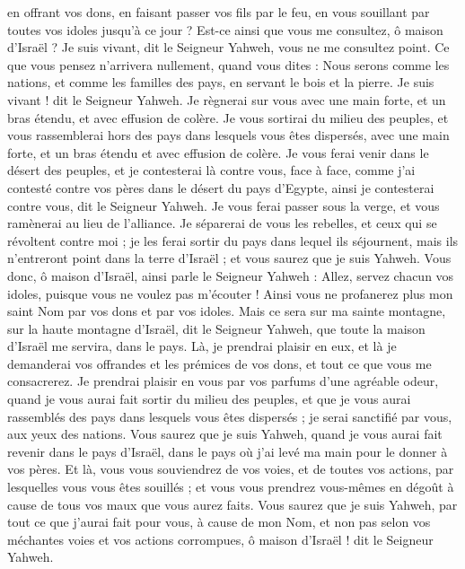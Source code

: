 \begin{multicols}{2}
en offrant vos dons, en faisant passer vos fils par le feu, en vous souillant par toutes vos idoles jusqu'à ce jour ? Est-ce ainsi que vous me consultez, ô maison d'Israël ? Je suis vivant, dit le Seigneur Yahweh, vous ne me consultez point.
Ce que vous pensez n'arrivera nullement, quand vous dites : Nous serons comme les nations, et comme les familles des pays, en servant le bois et la pierre.
Je suis vivant ! dit le Seigneur Yahweh. Je règnerai sur vous avec une main forte, et un bras étendu, et avec effusion de colère.
Je vous sortirai du milieu des peuples, et vous rassemblerai hors des pays dans lesquels vous êtes dispersés, avec une main forte, et un bras étendu et avec effusion de colère.
Je vous ferai venir dans le désert des peuples, et je contesterai là contre vous, face à face,
comme j'ai contesté contre vos pères dans le désert du pays d'Egypte, ainsi je contesterai contre vous, dit le Seigneur Yahweh.
Je vous ferai passer sous la verge, et vous ramènerai au lieu de l'alliance\FTNT{}.
Je séparerai de vous les rebelles, et ceux qui se révoltent contre moi ; je les ferai sortir du pays dans lequel ils séjournent, mais ils n'entreront point dans la terre d'Israël ; et vous saurez que je suis Yahweh.
Vous donc, ô maison d'Israël, ainsi parle le Seigneur Yahweh : Allez, servez chacun vos idoles, puisque vous ne voulez pas m’écouter ! Ainsi vous ne profanerez plus mon saint Nom par vos dons et par vos idoles.
Mais ce sera sur ma sainte montagne, sur la haute montagne d'Israël, dit le Seigneur Yahweh, que toute la maison d'Israël me servira, dans le pays\FTNT{}. Là, je prendrai plaisir en eux, et là je demanderai vos offrandes et les prémices de vos dons, et tout ce que vous me consacrerez.
Je prendrai plaisir en vous par vos parfums d’une agréable odeur, quand je vous aurai fait sortir du milieu des peuples, et que je vous aurai rassemblés des pays dans lesquels vous êtes dispersés ; je serai sanctifié par vous, aux yeux des nations.
Vous saurez que je suis Yahweh, quand je vous aurai fait revenir dans le pays d'Israël, dans le pays où j'ai levé ma main pour le donner à vos pères.
Et là, vous vous souviendrez de vos voies, et de toutes vos actions, par lesquelles vous vous êtes souillés ; et vous vous prendrez vous-mêmes en dégoût à cause de tous vos maux que vous aurez faits.
Vous saurez que je suis Yahweh, par tout ce que j'aurai fait pour vous, à cause de mon Nom, et non pas selon vos méchantes voies et vos actions corrompues, ô maison d'Israël ! dit le Seigneur Yahweh.

\end{multicols}
